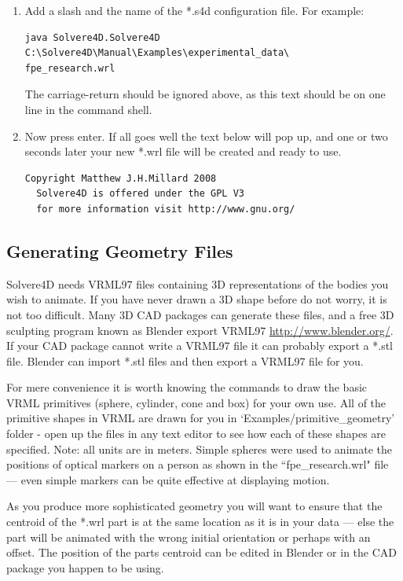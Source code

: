 \documentclass[singlecolumn,12pt]{article}
\begin{document}
\begin{enumerate}
\item Add a slash and the name of the *.s4d configuration file. For
example:


\footnotesize
\begin{verbatim}
java Solvere4D.Solvere4D C:\Solvere4D\Manual\Examples\experimental_data\
fpe_research.wrl
\end{verbatim}
\normalsize

The carriage-return should be ignored above, as this text should be
on one line in the command shell.


\item Now press enter. If all goes well the text below will pop up,
and one or two seconds later your new *.wrl file will be created and
ready to use.

\footnotesize
\begin{verbatim}
Copyright Matthew J.H.Millard 2008
  Solvere4D is offered under the GPL V3
  for more information visit http://www.gnu.org/
\end{verbatim}
\normalsize


\end{enumerate}


\subsection{Generating Geometry Files}

Solvere4D needs VRML97 files containing 3D representations of the
bodies you wish to animate. If you have never drawn a 3D shape
before do not worry, it is not too difficult. Many 3D CAD packages
can generate these files, and a free 3D sculpting program known as
Blender export VRML97 \url{http://www.blender.org/}. If your CAD
package cannot write a VRML97 file it can probably export a *.stl
file. Blender can import *.stl files and then export a VRML97 file
for you.

For mere convenience it is worth knowing the commands to draw the
basic VRML primitives (sphere, cylinder, cone and box) for your own
use. All of the primitive shapes in VRML are drawn for you in
`Examples/primitive\_geometry' folder - open up the files in any
text editor to see how each of these shapes are specified. Note: all
units are in meters. Simple spheres were used to animate the
positions of optical markers on a person as shown in the
``fpe\_research.wrl" file --- even simple markers can be quite
effective at displaying motion.

As you produce more sophisticated geometry you will want to ensure
that the centroid of the *.wrl part is at the same location as it is
in your data --- else the part will be animated with the wrong
initial orientation or perhaps with an offset. The position of the
parts centroid can be edited in Blender or in the CAD package you
happen to be using.
\end{document}
